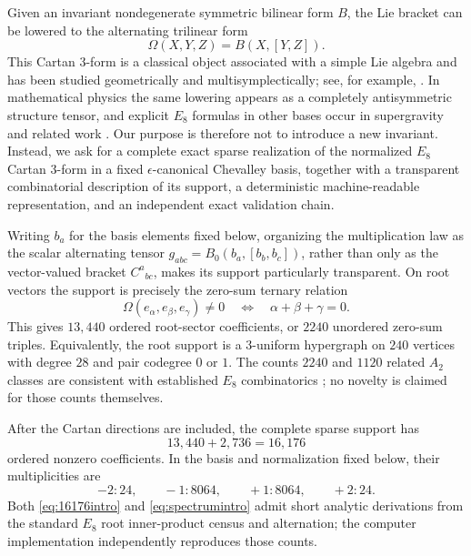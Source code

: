 \documentclass[11pt]{article}
\theoremstyle{definition}
\theoremstyle{remark}
\begin{document}
Given an invariant nondegenerate symmetric bilinear form $B$, the Lie bracket can be lowered to the alternating trilinear form
\begin{equation}\label{eq:cartan3}
\Omega(X,Y,Z)=B(X,[Y,Z]).
\end{equation}
This Cartan 3-form is a classical object associated with a simple Lie algebra and has been studied geometrically and multisymplectically; see, for example, \cite{Le2013}.  In mathematical physics the same lowering appears as a completely antisymmetric structure tensor, and explicit $E_8$ formulas in other bases occur in supergravity and related work \cite{KoepsellNicolaiSamtleben1999}.  Our purpose is therefore not to introduce a new invariant.  Instead, we ask for a complete exact sparse realization of the normalized $E_8$ Cartan 3-form in a fixed $\epsilon$-canonical Chevalley basis, together with a transparent combinatorial description of its support, a deterministic machine-readable representation, and an independent exact validation chain.

Writing $b_a$ for the basis elements fixed below, organizing the multiplication law as the scalar alternating tensor $g_{abc}=B_0(b_a,[b_b,b_c])$, rather than only as the vector-valued bracket $C^a{}_{bc}$, makes its support particularly transparent.  On root vectors the support is precisely the zero-sum ternary relation
\begin{equation}\label{eq:rootsupportintro}
\Omega(e_\alpha,e_\beta,e_\gamma)\neq 0
\quad\Longleftrightarrow\quad
\alpha+\beta+\gamma=0.
\end{equation}
This gives $13{,}440$ ordered root-sector coefficients, or $2240$ unordered zero-sum triples.  Equivalently, the root support is a $3$-uniform hypergraph on $240$ vertices with degree $28$ and pair codegree $0$ or $1$.  The counts $2240$ and $1120$ related $A_2$ classes are consistent with established $E_8$ combinatorics \cite{Manivel2006,BordnerMantonSasaki2000,WinterVanLuijk2021,BohningBothmerMarquand2026}; no novelty is claimed for those counts themselves.

After the Cartan directions are included, the complete sparse support has
\begin{equation}\label{eq:16176intro}
13{,}440+2{,}736=16{,}176
\end{equation}
ordered nonzero coefficients.  In the basis and normalization fixed below, their multiplicities are
\begin{equation}\label{eq:spectrumintro}
-2:24,\qquad -1:8064,\qquad +1:8064,\qquad +2:24.
\end{equation}
Both \eqref{eq:16176intro} and \eqref{eq:spectrumintro} admit short analytic derivations from the standard $E_8$ root inner-product census and alternation; the computer implementation independently reproduces those counts.
\end{document}
